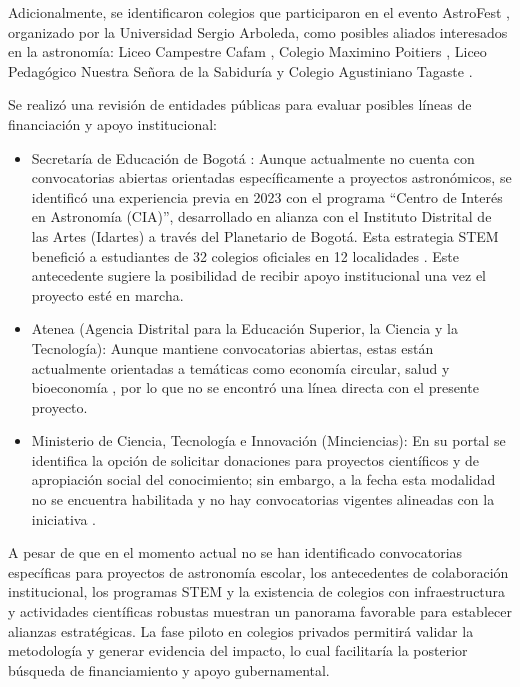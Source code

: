 Adicionalmente, se identificaron colegios que participaron en el evento AstroFest
\cite{astrofest2023}, organizado por la Universidad Sergio Arboleda,
como posibles aliados interesados en la astronomía: Liceo Campestre Cafam \cite{liceocafamweb},
Colegio Maximino Poitiers \cite{maximinoweb}, Liceo Pedagógico Nuestra Señora
de la Sabiduría \cite{sabiduriaweb} y Colegio Agustiniano Tagaste \cite{agustiniano_tagaste}.

Se realizó una revisión de entidades públicas para evaluar posibles líneas de
financiación y apoyo institucional:

\begin{itemize}
  \item Secretaría de Educación de Bogotá \cite{sedbogota}:
    Aunque actualmente no cuenta con convocatorias abiertas orientadas
    específicamente a proyectos astronómicos, se identificó una experiencia
    previa en 2023 con el programa ``Centro de Interés en Astronomía (CIA)'',
    desarrollado en alianza con el Instituto Distrital de las Artes (Idartes) a
    través del Planetario de Bogotá.
    Esta estrategia STEM benefició a estudiantes de 32 colegios oficiales en 12
    localidades \cite{sed2023}.
    Este antecedente sugiere la posibilidad de recibir apoyo institucional una
    vez el proyecto esté en marcha.

  \item  Atenea (Agencia Distrital para la Educación Superior, la Ciencia y la
    Tecnología): Aunque mantiene convocatorias abiertas, estas están actualmente
    orientadas a temáticas como economía circular, salud y bioeconomía
    \cite{atenea2024}, por lo que no se encontró una línea directa con el
    presente proyecto.

  \item Ministerio de Ciencia, Tecnología e Innovación (Minciencias):
    En su portal se identifica la opción de solicitar donaciones para proyectos
    científicos y de apropiación social del conocimiento; sin embargo, a la fecha
    esta modalidad no se encuentra habilitada y no hay convocatorias
    vigentes alineadas con la iniciativa \cite{minciencias2024}.
\end{itemize}

A pesar de que en el momento actual no se han identificado convocatorias
específicas para proyectos de astronomía escolar, los antecedentes de
colaboración institucional, los programas STEM y la existencia de colegios
con infraestructura y actividades científicas robustas muestran un panorama
favorable para establecer alianzas estratégicas.
La fase piloto en colegios privados permitirá validar la metodología y generar
evidencia del impacto, lo cual facilitaría la posterior búsqueda de
financiamiento y apoyo gubernamental.
